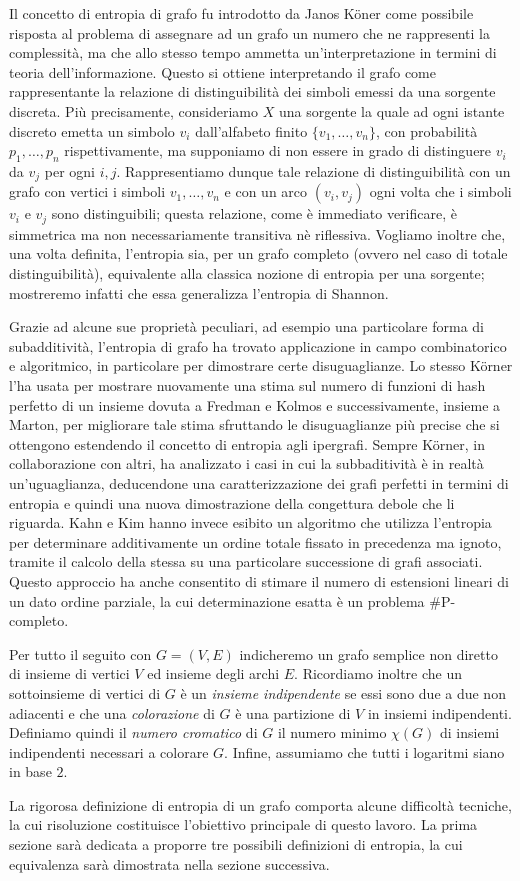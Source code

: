 Il concetto di entropia di grafo fu introdotto da Janos K\"oner come possibile risposta al problema di assegnare ad un grafo un numero che ne rappresenti la complessità, ma che allo stesso tempo ammetta un'interpretazione in termini di teoria dell'informazione.
Questo si ottiene interpretando il grafo come rappresentante la relazione di distinguibilità dei simboli emessi da una sorgente discreta. Più precisamente, consideriamo $X$ una sorgente la quale ad ogni istante discreto emetta un simbolo $v_i$ dall'alfabeto finito $\{v_1,\dots,v_n\}$, con probabilità $p_1,\dots,p_n$ rispettivamente, ma supponiamo di non essere in grado di distinguere $v_i$ da $v_j$ per ogni $i,j$. Rappresentiamo dunque tale relazione di distinguibilità con un grafo con vertici i simboli $v_1,\dots,v_n$ e con un arco $(v_i,v_j)$ ogni volta che i simboli $v_i$ e $v_j$ sono distinguibili; questa relazione, come è immediato verificare, è simmetrica ma non necessariamente transitiva nè riflessiva. 
Vogliamo inoltre che, una volta definita, l'entropia sia, per un grafo completo (ovvero nel caso di totale distinguibilità), equivalente alla classica nozione di entropia per una sorgente; mostreremo infatti che essa generalizza l'entropia di Shannon.

Grazie ad alcune sue proprietà peculiari, ad esempio una particolare forma di subadditività, l'entropia di grafo ha trovato applicazione in campo combinatorico e algoritmico, in particolare per dimostrare certe disuguaglianze.
Lo stesso K\"orner l'ha usata per mostrare nuovamente una stima sul numero di funzioni di hash perfetto di un insieme dovuta a Fredman e Kolmos e successivamente, insieme a Marton, per migliorare tale stima sfruttando le disuguaglianze più precise che si ottengono estendendo il concetto di entropia agli ipergrafi. 
Sempre K\"orner, in collaborazione con altri, ha analizzato i casi in cui la subbaditività è in realtà un'uguaglianza, deducendone una caratterizzazione dei grafi perfetti in termini di entropia e quindi una nuova dimostrazione della congettura debole che li riguarda.
Kahn e Kim hanno invece esibito un algoritmo che utilizza l'entropia per determinare additivamente un ordine totale fissato in precedenza ma ignoto, tramite il calcolo della stessa su una particolare successione di grafi associati. Questo approccio ha anche consentito di stimare il numero di estensioni lineari di un dato ordine parziale, la cui determinazione esatta è un problema \#P-completo.

Per tutto il seguito con $G=(V,E)$ indicheremo un grafo semplice non diretto di insieme di vertici $V$ ed insieme degli archi $E$. Ricordiamo inoltre che un sottoinsieme di vertici di $G$ è un \emph{insieme indipendente} se essi sono due a due non adiacenti e che una \emph{colorazione} di $G$ è una partizione di $V$ in insiemi indipendenti. Definiamo quindi il \emph{numero cromatico} di $G$ il numero minimo $\chi(G)$ di insiemi indipendenti necessari a colorare $G$. Infine, assumiamo che tutti i logaritmi siano in base $2$.

La rigorosa definizione di entropia di un grafo comporta alcune difficoltà tecniche, la cui risoluzione costituisce l'obiettivo principale di questo lavoro. La prima sezione sarà dedicata a proporre tre possibili definizioni di entropia, la cui equivalenza sarà dimostrata nella sezione successiva.
